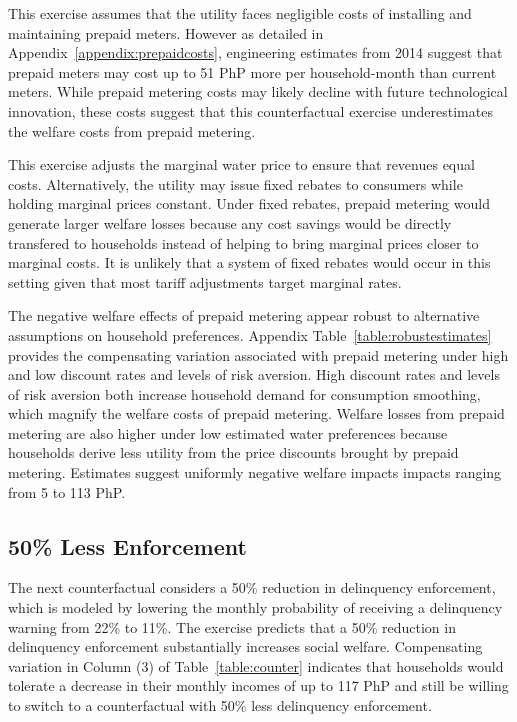 \documentclass[12pt,table]{article}
\begin{document}
This exercise assumes that the utility faces negligible costs of installing and maintaining prepaid meters.  However as detailed in Appendix~\ref{appendix:prepaidcosts}, engineering estimates from 2014 suggest that prepaid meters may cost up to 51 PhP more per household-month than current meters.  While prepaid metering costs may likely decline with future technological innovation, these costs suggest that this counterfactual exercise underestimates the welfare costs from prepaid metering.    

This exercise adjusts the marginal water price to ensure that revenues equal costs.  Alternatively, the utility may issue fixed rebates to consumers while holding marginal prices constant.  Under fixed rebates, prepaid metering would generate larger welfare losses because any cost savings would be directly transfered to households instead of helping to bring marginal prices closer to marginal costs.  It is unlikely that a system of fixed rebates would occur in this setting given that most tariff adjustments target marginal rates.

The negative welfare effects of prepaid metering appear robust to alternative assumptions on household preferences.  Appendix Table~\ref{table:robustestimates} provides the compensating variation associated with prepaid metering under high and low discount rates and levels of risk aversion.  High discount rates and levels of risk aversion both increase household demand for consumption smoothing, which magnify the welfare costs of prepaid metering.  Welfare losses from prepaid metering are also higher under low estimated water preferences because households derive less utility from the price discounts brought by prepaid metering.  Estimates suggest uniformly negative welfare impacts impacts ranging from 5 to 113 PhP.


\subsection{50\% Less Enforcement}
The next counterfactual considers a 50\% reduction in delinquency enforcement, which is modeled by lowering the monthly probability of receiving a delinquency warning from 22\% to 11\%.  The exercise predicts that a 50\% reduction in delinquency enforcement substantially increases social welfare.  Compensating variation in Column (3) of Table~\ref{table:counter} indicates that households would tolerate a decrease in their monthly incomes of up to 117 PhP and still be willing to switch to a counterfactual with 50\% less delinquency enforcement.  
\end{document}
